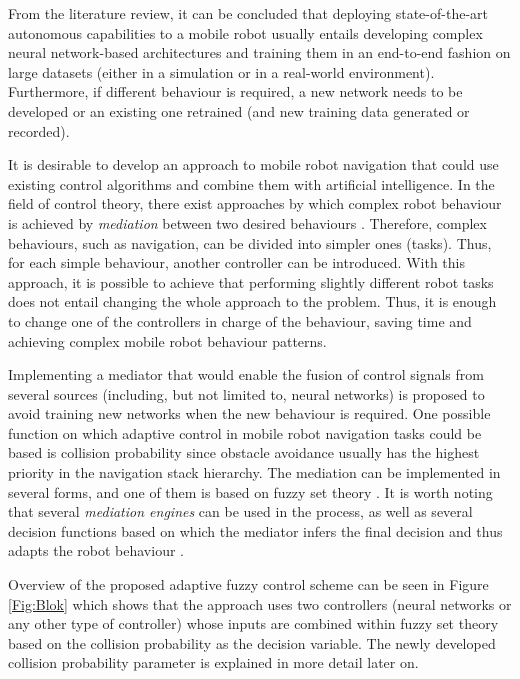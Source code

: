 From the literature review, it can be concluded that deploying state-of-the-art autonomous capabilities to a mobile robot usually entails developing complex neural network-based architectures and training them in an end-to-end fashion on large datasets (either in a simulation or in a real-world environment). Furthermore, if different behaviour is required, a new network needs to be developed or an existing one retrained (and new training data generated or recorded). 

It is desirable to develop an approach to mobile robot navigation that could use existing control algorithms and combine them with artificial intelligence. In the field of control theory, there exist approaches by which complex robot behaviour is achieved by \emph{mediation} between two desired behaviours \cite{Vincenti2009}. Therefore, complex behaviours, such as navigation, can be divided into simpler ones (tasks). Thus, for each simple behaviour, another controller can be introduced. With this approach, it is possible to achieve that performing slightly different robot tasks does not entail changing the whole approach to the problem. Thus, it is enough to change one of the controllers in charge of the behaviour, saving time and achieving complex mobile robot behaviour patterns. 

Implementing a mediator that would enable the fusion of control signals from several sources (including, but not limited to, neural networks) is proposed to avoid training new networks when the new behaviour is required. One possible function on which adaptive control in mobile robot navigation tasks could be based is collision probability \cite{Lunenburg2017} since obstacle avoidance usually has the highest priority in the navigation stack hierarchy. The mediation can be implemented in several forms, and one of them is based on fuzzy set theory \cite{Chen2017}. It is worth noting that several \emph{mediation engines} can be used in the process, as well as several decision functions based on which the mediator infers the final decision and thus adapts the robot behaviour \cite{Vincenti2009}.

Overview of the proposed adaptive fuzzy control scheme can be seen in Figure \ref{Fig:Blok} which shows that the approach uses two controllers (neural networks or any other type of controller) whose inputs are combined within fuzzy set theory based on the collision probability as the decision variable. The newly developed collision probability parameter is explained in more detail later on.

